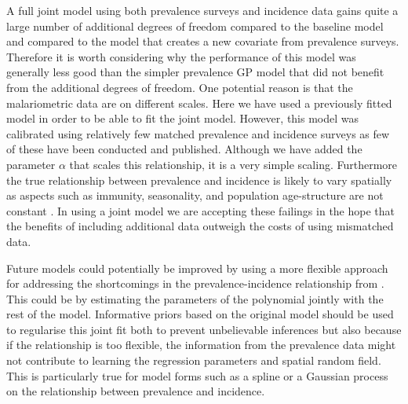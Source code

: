 \documentclass{statsoc}
\begin{document}
%




A full joint model using both prevalence surveys and incidence data gains quite a large number of additional degrees of freedom compared to the baseline model and compared to the model that creates a new covariate from prevalence surveys.
Therefore it is worth considering why the performance of this model was generally less good than the simpler prevalence GP model that did not benefit from the additional degrees of freedom.
One potential reason is that the malariometric data are on different scales.
Here we have used a previously fitted model \citep{cameron2015defining} in order to be able to fit the joint model.
However, this model was calibrated using relatively few matched prevalence and incidence surveys as few of these have been conducted and published.
Although we have added the parameter $\alpha$ that scales this relationship, it is a very simple scaling.
Furthermore the true relationship between prevalence and incidence is likely to vary spatially as aspects such as immunity, seasonality, and population age-structure are not constant \citep{cameron2015defining, battle2015defining, reiner2015seasonality}.
In using a joint model we are accepting these failings in the hope that the benefits of including additional data outweigh the costs of using mismatched data.


Future models could potentially be improved by using a more flexible approach for addressing the shortcomings in the prevalence-incidence relationship from \citep{cameron2015defining}.
This could be by estimating the parameters of the polynomial jointly with the rest of the model.
Informative priors based on the original model should be used to regularise this joint fit both to prevent unbelievable inferences but also because if the relationship is too flexible, the information from the prevalence data might not contribute to learning the regression parameters and spatial random field.
This is particularly true for model forms such as a spline or a Gaussian process on the relationship between prevalence and incidence.
\end{document}
